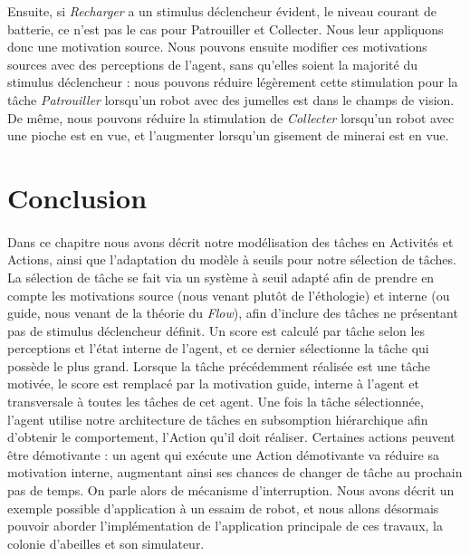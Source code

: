 		Ensuite, si \textit{Recharger} a un stimulus déclencheur évident, le niveau courant de batterie, ce n'est pas le cas pour Patrouiller et Collecter. Nous leur appliquons donc une motivation source. Nous pouvons ensuite modifier ces motivations sources avec des perceptions de l'agent, sans qu'elles soient la majorité du stimulus déclencheur : nous pouvons réduire légèrement cette stimulation pour la tâche \textit{Patrouiller} lorsqu'un robot avec des jumelles est dans le champs de vision. De même, nous pouvons réduire la stimulation de \textit{Collecter} lorsqu'un robot avec une pioche est en vue, et l'augmenter lorsqu'un gisement de minerai est en vue.
			
			
				
	\section*{Conclusion}
		\paragraph{}
		Dans ce chapitre nous avons décrit notre modélisation des tâches en Activités et Actions, ainsi que l'adaptation du modèle à seuils pour notre sélection de tâches. La sélection de tâche se fait via un système à seuil adapté afin de prendre en compte les motivations source (nous venant plutôt de l'éthologie) et interne (ou guide, nous venant de la théorie du \textit{Flow}), afin d'inclure des tâches ne présentant pas de stimulus déclencheur définit. Un score est calculé par tâche selon les perceptions et l'état interne de l'agent, et ce dernier sélectionne la tâche qui possède le plus grand. Lorsque la tâche précédemment réalisée est une tâche motivée, le score est remplacé par la motivation guide, interne à l'agent et transversale à toutes les tâches de cet agent. Une fois la tâche sélectionnée, l'agent utilise notre architecture de tâches en subsomption hiérarchique afin d'obtenir le comportement, l'Action qu'il doit réaliser. Certaines actions peuvent être démotivante : un agent qui exécute une Action démotivante va réduire sa motivation interne, augmentant ainsi ses chances de changer de tâche au prochain pas de temps. On parle alors de mécanisme d'interruption. Nous avons décrit un exemple possible d'application à un essaim de robot, et nous allons désormais pouvoir aborder l'implémentation de l'application principale de ces travaux, la colonie d'abeilles et son simulateur.

